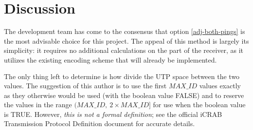 \documentclass[12pt]{article}
\begin{document}
\section{Discussion}

The development team has come to the consensus that option \ref{adj-both-pings}
is the most advisable choice for this project.
The appeal of this method is largely its simplicity:
it requires no additional calculations on the part of the receiver, as it
utilizes the existing encoding scheme that will already be implemented.

The only thing left to determine is how divide the UTP space between the two
values.
The suggestion of this author is to use the first $MAX\_ID$ values exactly as
they otherwise would be used (with the boolean value FALSE)
and to reserve the values in the range $(MAX\_ID,\ 2 \times MAX\_ID]$ for
use when the boolean value is TRUE.
However, {\em this is not a formal definition};
see the official iCRAB Transmission Protocol Definition document for accurate
details.
\end{document}
